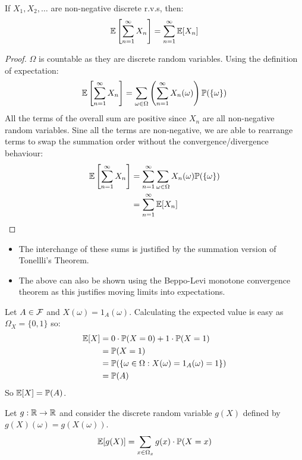 \documentclass[../main.tex]{subfiles}
\begin{document}
\begin{lemma}
  If $X_1, X_2, \ldots$ are non-negative discrete r.v.s, then:
  \label{sumExpectationSwap}
  \[
    \mathbb{E}\left[\sum_{n = 1}^{\infty} X_n\right] = \sum_{n = 1}^{\infty} \mathbb{E}[X_n]
  \]
\end{lemma}
\begin{proof}
  $\Omega$ is countable as they are discrete random variables.
  Using the definition of expectation:
  \[
    \mathbb{E}\left[\sum_{n = 1}^{\infty} X_n\right] = \sum_{\omega \in \Omega} \left(\sum_{n = 1}^{\infty} X_n(\omega)\right)\mathbb{P}(\{\omega\})
  \]
  All the terms of the overall sum are positive since $X_n$ are all non-negative random variables.
  Sine all the terms are non-negative, we are able to rearrange terms to swap the summation order without the convergence/divergence behaviour:
  \begin{align*}
    \mathbb{E}\left[\sum_{n = 1}^{\infty} X_n\right] &= \sum_{n = 1}^{\infty} \sum_{\omega \in \Omega} X_n(\omega)\mathbb{P}(\{\omega\}) \\
                                             &= \sum_{n = 1}^{\infty} \mathbb{E}[X_n]
  \end{align*}
\end{proof}
\begin{remark}
  \nonexaminable
  \begin{itemize}
    \item The interchange of these sums is justified by the summation version of Tonellli's Theorem.
    \item The above can also be shown using the Beppo-Levi monotone convergence theorem as this justifies moving limits into expectations.
  \end{itemize}
\end{remark}
\begin{example}
  \label{expOfIndicator}
  Let $A \in \mathcal{F}$ and $X(\omega) = 1_A(\omega)$.
  Calculating the expected value is easy as $\Omega_X = \{0, 1\}$ so:
  \begin{align*}
    \mathbb{E}[X] &= 0 \cdot \mathbb{P}(X = 0) + 1 \cdot \mathbb{P}(X = 1) \\
          &= \mathbb{P}(X = 1) \\
          &= \mathbb{P}(\{\omega \in \Omega: X(\omega) = 1_A(\omega) = 1\}) \\
          &= \mathbb{P}(A)
  \end{align*}
  So $\mathbb{E}[X] = \mathbb{P}(A)$.
\end{example}
\begin{proposition}
  Let $g: \mathbb{R} \to \mathbb{R}$ and consider the discrete random variable $g(X)$ defined by $g(X)(\omega) = g(X(\omega))$.
  \label{expectationFunction}
  \[
    \mathbb{E}[g(X)] = \sum_{x \in \Omega_x} g(x) \cdot \mathbb{P}(X = x)
  \]
\end{proposition}
\end{document}
